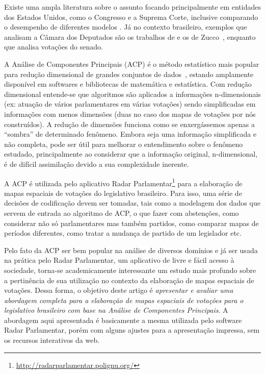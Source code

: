 \documentclass[
	article,			%
	12pt,				%
    twoside,			%
	a4paper,			%
	english,			%
	french,				%
	spanish,			%
	brazil,				%
	]{abntex2}
\begin{document}
Existe uma ampla literatura sobre o assunto focando principalmente em entidades dos Estados Unidos, como o Congresso e a Suprema Corte, inclusive comparando o desempenho de diferentes modelos 
\cite{poole-rosenthal2000,clinton2004ideal,carroll2009comparing}.
Já no contexto brasileiro, exemplos que analisam a Câmara dos Deputados são os trabalhos de  e os de Zucco~\cite{zucco2011ideologia, zucco2011distinguishing}, enquanto que  analisa votações do senado. 

A Análise de Componentes Principais (ACP) é o método estatístico mais popular para redução dimensional de grandes conjuntos de dados~\cite{DataMining2003}, estando amplamente disponível em softwares e bibliotecas de matemática e estatística. Com redução dimensional entende-se que algoritmos são aplicados a informações n-dimensionais (ex: atuação de vários parlamentares em várias votações) sendo simplificadas em informações com menos dimensões (duas no caso dos mapas de votações por nós construídos). A redução de dimensões funciona como se enxergássemos apenas a ``sombra'' de determinado fenômeno. Embora seja uma informação simplificada e não completa, pode ser útil para melhorar o entendimento sobre o fenômeno estudado, principalmente ao considerar que a informação original, n-dimensional, é de difícil assimilação devido a sua complexidade inerente.

A ACP é utilizada pelo aplicativo Radar Parlamentar\footnote{\url{http://radarparlamentar.polignu.org/}} para a elaboração de mapas espaciais de votações do legislativo brasileiro. Para isso, uma série de decisões de codificação devem ser tomadas, tais como a modelagem dos dados que servem de entrada ao algoritmo de ACP, o que fazer com abstenções, como considerar não só parlamentares mas também partidos, como comparar mapas de períodos diferentes, como tratar a mudança de partido de um legislador etc. 

Pelo fato da ACP ser bem popular na análise de diversos domínios e já ser usada na prática pelo Radar Parlamentar, um aplicativo de livre e fácil acesso à sociedade, torna-se academicamente interessante um estudo mais profundo sobre a pertinência de sua utilização no contexto da elaboração de mapas espaciais de votações.
Dessa forma, o objetivo deste artigo é \emph{apresentar e avaliar uma abordagem completa para a elaboração de mapas espaciais de votações para o legislativo brasileiro com base na Análise de Componentes Principais}. A abordagem aqui apresentada é basicamente a mesma utilizada pelo software Radar Parlamentar, porém com alguns ajustes para a apresentação impressa, sem os recursos interativos da web.
\end{document}
